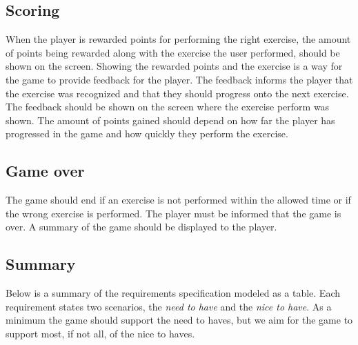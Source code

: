 \documentclass[11pt]{report}
\begin{document}
\subsection{Scoring}
When the player is rewarded points for performing the right exercise, the amount of points being rewarded along with the exercise the user performed, should be shown on the screen. Showing the rewarded points and the exercise is a way for the game to provide feedback for the player. The feedback informs the player that the exercise was recognized and that they should progress onto the next exercise. The feedback should be shown on the screen where the exercise perform was shown. The amount of points gained should depend on how far the player has progressed in the game and how quickly they perform the exercise.

\subsection{Game over}
The game should end if an exercise is not performed within the allowed time or if the wrong exercise is performed. The player must be informed that the game is over. A summary of the game should be displayed to the player.

\subsection{Summary}
Below is a summary of the requirements specification modeled as a table. Each requirement states two scenarios, the \emph{need to have} and the \emph{nice to have}. As a minimum the game should support the need to haves, but we aim for the game to support most, if not all, of the nice to haves. 
\end{document}
